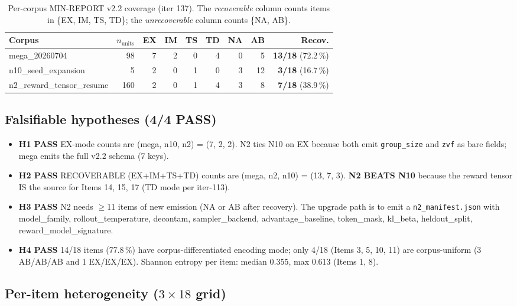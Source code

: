 \begin{table}[t]
\centering
\caption{Per-corpus MIN-REPORT v2.2 coverage (iter 137). The
\emph{recoverable} column counts items in \{EX, IM, TS, TD\}; the
\emph{unrecoverable} column counts \{NA, AB\}.}
\label{tab:p5-iter137-corpus}
\small
\begin{tabular}{@{}lrrrrrrrr@{}}
\toprule
Corpus & $n_{\text{units}}$ & EX & IM & TS & TD & NA & AB & Recov. \\
\midrule
mega\_20260704            &  98 & 7 & 2 & 0 & 4 & 0 & 5 & \textbf{13/18} (72.2\,\%) \\
n10\_seed\_expansion      &   5 & 2 & 0 & 1 & 0 & 3 & 12 & \textbf{3/18} (16.7\,\%) \\
n2\_reward\_tensor\_resume & 160 & 2 & 0 & 1 & 4 & 3 & 8 & \textbf{7/18} (38.9\,\%) \\
\bottomrule
\end{tabular}
\end{table}

\subsection*{Falsifiable hypotheses (4/4 PASS)}

\begin{itemize}
  \item \textbf{H1 PASS} EX-mode counts are (mega, n10, n2) = (7, 2, 2).
    N2 ties N10 on EX because both emit \texttt{group\_size} and \texttt{zvf}
    as bare fields; mega emits the full v2.2 schema (7 keys).
  \item \textbf{H2 PASS} RECOVERABLE (EX+IM+TS+TD) counts are (mega, n2,
    n10) = (13, 7, 3). \textbf{N2 BEATS N10} because the reward tensor IS
    the source for Items 14, 15, 17 (TD mode per iter-113).
  \item \textbf{H3 PASS} N2 needs $\geq$11 items of new emission (NA or AB
    after recovery). The upgrade path is to emit a
    \texttt{n2\_manifest.json} with model\_family, rollout\_temperature,
    decontam, sampler\_backend, advantage\_baseline, token\_mask,
    kl\_beta, heldout\_split, reward\_model\_signature.
  \item \textbf{H4 PASS} 14/18 items (77.8\,\%) have corpus-differentiated
    encoding mode; only 4/18 (Items 3, 5, 10, 11) are corpus-uniform
    (3 AB/AB/AB and 1 EX/EX/EX). Shannon entropy per item: median 0.355,
    max 0.613 (Items 1, 8).
\end{itemize}

\subsection*{Per-item heterogeneity (\texorpdfstring{$3 \times 18$}{3x18} grid)}

